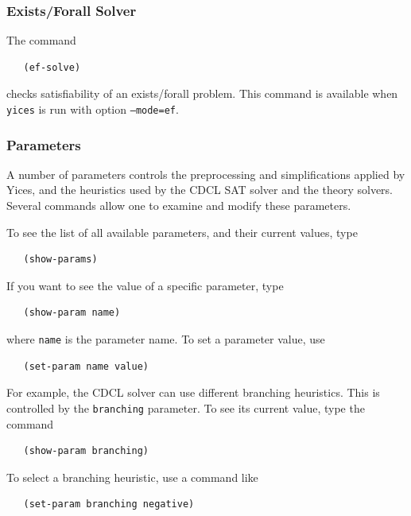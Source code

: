 \documentclass[11pt,twoside,fleqn,openright,titlepage]{cslreport}
\begin{document}
\subsubsection*{Exists/Forall Solver}

The command
\begin{small}
\begin{verbatim}
   (ef-solve)
\end{verbatim}
\end{small}
checks satisfiability of an exists/forall problem. This command is
available when \texttt{yices} is run with option \texttt{--mode=ef}.


\subsubsection*{Parameters}

A number of parameters controls the preprocessing and simplifications
applied by Yices, and the heuristics used by the CDCL SAT solver and
the theory solvers. Several commands allow one to examine and modify
these parameters.

\medskip\noindent
To see the list of all available parameters, and their current values, type
\begin{small}
\begin{verbatim}
   (show-params)
\end{verbatim}
\end{small}
If you want to see the value of a specific parameter, type
\begin{small}
\begin{verbatim}
   (show-param name)
\end{verbatim}
\end{small}
where \texttt{name} is the parameter name. To set a parameter value, use
\begin{small}
\begin{verbatim}
   (set-param name value)
\end{verbatim}
\end{small}
For example, the CDCL solver can use different branching
heuristics. This is controlled by the \texttt{branching} parameter. To
see its current value, type the command
\begin{small}
\begin{verbatim}
   (show-param branching)
\end{verbatim}
\end{small}
To select a branching heuristic, use a command like
\begin{small}
\begin{verbatim}
   (set-param branching negative)
\end{verbatim}
\end{small}
\end{document}

